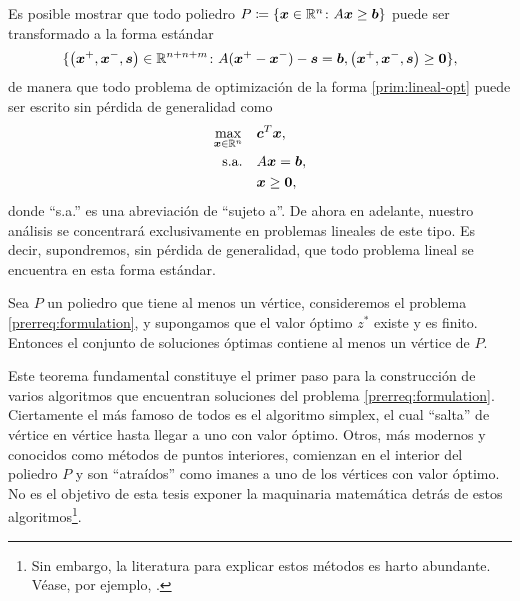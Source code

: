 Es posible mostrar que todo poliedro $P \coloneq \lbrace \boldsymbol{x} \in \mathbb{R}^n \colon A\boldsymbol{x} \geq
\boldsymbol{b} \rbrace$ puede ser transformado a la forma estándar
\begin{equation*}
	\lbrace \left( \boldsymbol{x}^+, \boldsymbol{x}^-, \boldsymbol{s} \right) \in \mathbb{R}^{n + n + m} \colon A(\boldsymbol{x}^+ -
\boldsymbol{x}^-) - \boldsymbol{s} = \boldsymbol{b}, \left(\boldsymbol{x}^+, \boldsymbol{x}^-, \boldsymbol{s}\right) \geq \boldsymbol{0}\rbrace,
\end{equation*}
de manera que todo problema de optimización de la forma \eqref{prim:lineal-opt} puede ser escrito
sin pérdida de generalidad como
\begin{subequations}
	\label{prerreq:formulation}
	\begin{align}
		\max_{\boldsymbol{x} \in \mathbb{R}^n} \quad
			& \boldsymbol{c}^T\boldsymbol{x}, \label{prerreq:formulation:objective} \\
		\text{s.a.} \quad
			& A\boldsymbol{x} = \boldsymbol{b}, \label{prerreq:formulation:constraints} \\
			& \boldsymbol{x} \geq \boldsymbol{0} \nonumber,
	\end{align}
\end{subequations}
donde ``s.a.'' es una abreviación de ``sujeto a''. De ahora en adelante, nuestro análisis se
concentrará exclusivamente en problemas lineales de este tipo. Es decir, supondremos, sin pérdida de
generalidad, que todo problema lineal se encuentra en esta forma estándar.

\begin{theorem}
	\label{prerreq:th:linear-sol}
	Sea $P$ un poliedro que tiene al menos un vértice, consideremos el problema
	\eqref{prerreq:formulation}, y supongamos que el valor óptimo $z^*$ existe y es finito. Entonces
	el conjunto de soluciones óptimas contiene al menos un vértice de $P$.
\end{theorem}

Este teorema fundamental constituye el primer paso para la construcción de varios algoritmos que
encuentran soluciones del problema \eqref{prerreq:formulation}. Ciertamente el más famoso de todos
es el algoritmo simplex, el cual ``salta'' de vértice en vértice hasta llegar a uno con valor
óptimo. Otros, más modernos y conocidos como métodos de puntos interiores, comienzan en el interior
del poliedro $P$ y son ``atraídos'' como imanes a uno de los vértices con valor óptimo. No es el
objetivo de esta tesis exponer la maquinaria matemática detrás de estos algoritmos\footnote{
	Sin embargo, la literatura para explicar estos métodos es harto abundante. Véase, por ejemplo,
	\cite{nocedal}.
}.

